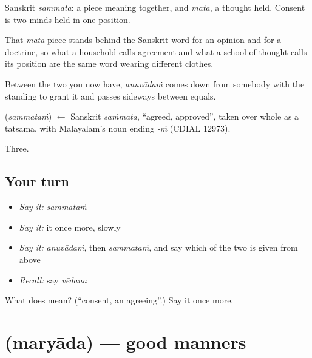 Sanskrit \emph{sammata}: a piece meaning together, and \emph{mata}, a thought held. Consent is two minds held in one position.

That \emph{mata} piece stands behind the Sanskrit word for an opinion and for a doctrine, so what a household calls agreement and what a school of thought calls its position are the same word wearing different clothes.

Between the two you now have, \emph{anuvādaṁ} comes down from somebody with the standing to grant it and  passes sideways between equals.

\begin{cousinweb}
\textbf{} (\emph{sammataṁ}) $\leftarrow$ Sanskrit \emph{saṁmata}, \textquotedblleft{}agreed, approved\textquotedblright{}, taken over whole as a tatsama, with Malayalam's noun ending \emph{-ṁ} (CDIAL 12973).
\end{cousinweb}

\begin{grammarlens}[title={What you've built}]
Three.
\end{grammarlens}

\subsection*{Your turn}
\begin{itemize}
\raggedright
  \item \emph{Say it:} \emph{sammataṁ}
  \item \emph{Say it:} it once more, slowly
  \item \emph{Say it:} \emph{anuvādaṁ}, then \emph{sammataṁ}, and say which of the two is given from above
  \item \emph{Recall:} say \emph{vēdana}
\end{itemize}

\begin{tcolorbox}[breakable,colback=teal!4,colframe=teal!35!black,title={Before you move on}]
What does  mean? (\textquotedblleft{}consent, an agreeing\textquotedblright{}.) Say it once more.
\end{tcolorbox}
\section[\texorpdfstring{\ml{മര്യാദ} (maryāda)}{മര്യാദ (maryāda)}]{ (maryāda) — good manners}

\label{lesson:ML-C65-manners}



